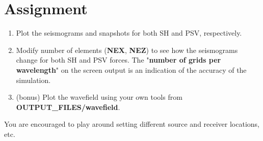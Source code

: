 \documentclass[11pt,titlepage,fleqn]{article}
\begin{document}
\section*{Assignment}

\begin{enumerate}

\item Plot the seismograms and snapshots for both SH and PSV, respectively.

\item Modify number of elements ({\bf NEX}, {\bf NEZ}) to see how the seismograms change for both SH and
PSV forces. The "{\bf number of grids per wavelength}" on the screen output is an indication of the accuracy of the simulation.
\item (bonus) Plot the wavefield using your own tools from {\bf OUTPUT\_FILES/wavefield}.
        
\end{enumerate}

You are encouraged to play around setting different source and receiver locations, etc.
\end{document}
